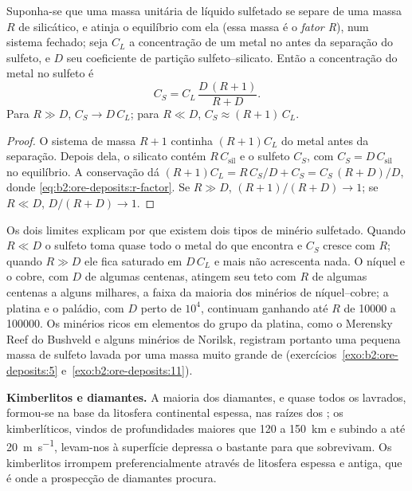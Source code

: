 \begin{proposition}[Fator R]\label{prop:b2:ore-deposits:r-factor}
Suponha-se que uma massa unitária de líquido sulfetado se separe de uma massa $R$ de  silicático, e atinja o equilíbrio com ela
(essa massa é o \emph{fator R}), num sistema fechado; seja $C_L$ a concentração de um
metal no  antes da separação do sulfeto, e $D$ seu coeficiente de partição
sulfeto--silicato. Então a concentração do metal no sulfeto é
\begin{equation}
C_S = C_L\,\frac{D\,(R + 1)}{R + D} .
\label{eq:b2:ore-deposits:r-factor}
\end{equation}
Para $R \gg D$, $C_S \to D\,C_L$; para $R \ll D$, $C_S \approx (R + 1)\,C_L$.
\end{proposition}

\begin{proof}
O sistema de massa $R + 1$ continha $(R + 1)C_L$ do metal antes da separação. Depois dela, o silicato
contém $R\,C_{\mathrm{sil}}$ e o sulfeto $C_S$, com $C_S = D\,C_{\mathrm{sil}}$ no equilíbrio.
A conservação dá $(R + 1)C_L = R\,C_S/D + C_S = C_S\,(R + D)/D$, donde
\eqref{eq:b2:ore-deposits:r-factor}. Se $R \gg D$, $(R + 1)/(R + D) \to 1$; se $R \ll D$,
$D/(R + D) \to 1$.
\end{proof}

Os dois limites explicam por que existem dois tipos de minério sulfetado. Quando $R \ll D$ o sulfeto toma
quase todo o metal do  que encontra e $C_S$ cresce com $R$; quando $R \gg D$ ele fica
saturado em $D\,C_L$ e mais  não acrescenta nada. O níquel e o cobre, com $D$ de algumas centenas,
atingem seu teto com $R$ de algumas centenas a alguns milhares, a faixa da maioria dos minérios de níquel--cobre;
a platina e o paládio, com $D$ perto de $10^4$, continuam ganhando até $R$ de \num{10000} a
\num{100000}. Os minérios ricos em elementos do grupo da platina, como o Merensky Reef do Bushveld e
alguns minérios de Norilsk, registram portanto uma pequena massa de sulfeto lavada por uma massa muito grande de
 (exercícios~\ref{exo:b2:ore-deposits:5} e~\ref{exo:b2:ore-deposits:11}).

\textbf{Kimberlitos e diamantes.} A maioria dos diamantes, e quase todos os lavrados, formou-se na base da
litosfera continental espessa, nas raízes dos ; os  kimberlíticos, vindos de profundidades
maiores que 120 a \qty{150}{km} e subindo a até \qty{20}{m.s^{-1}}, levam-nos à
superfície depressa o bastante para que sobrevivam. Os kimberlitos irrompem preferencialmente através de litosfera espessa e antiga,
que é onde a prospecção de diamantes procura.

